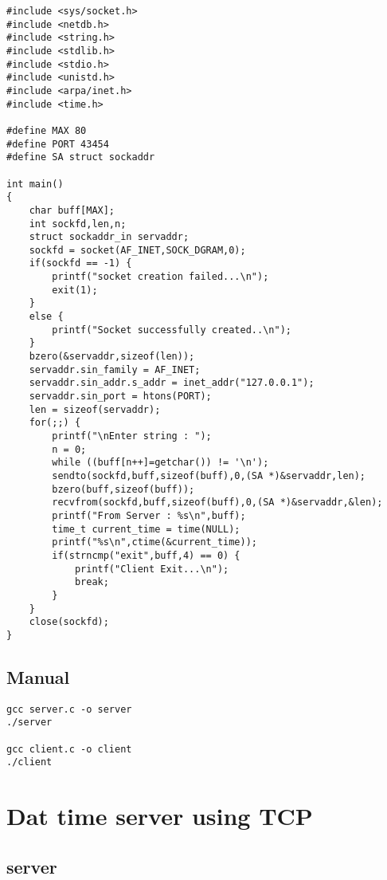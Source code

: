 \documentclass[12pt]{article}
\begin{document}
\begin{lstlisting}
#include <sys/socket.h>
#include <netdb.h>
#include <string.h>
#include <stdlib.h>
#include <stdio.h>
#include <unistd.h>
#include <arpa/inet.h>
#include <time.h>

#define MAX 80
#define PORT 43454
#define SA struct sockaddr

int main()
{
	char buff[MAX];
	int sockfd,len,n;
	struct sockaddr_in servaddr;
	sockfd = socket(AF_INET,SOCK_DGRAM,0);
	if(sockfd == -1) {
		printf("socket creation failed...\n");
		exit(1);
	}
	else {
		printf("Socket successfully created..\n");
	}
	bzero(&servaddr,sizeof(len));
	servaddr.sin_family = AF_INET;
	servaddr.sin_addr.s_addr = inet_addr("127.0.0.1");
	servaddr.sin_port = htons(PORT);
	len = sizeof(servaddr);
	for(;;) {
		printf("\nEnter string : ");
		n = 0;
		while ((buff[n++]=getchar()) != '\n');
		sendto(sockfd,buff,sizeof(buff),0,(SA *)&servaddr,len);
		bzero(buff,sizeof(buff));
		recvfrom(sockfd,buff,sizeof(buff),0,(SA *)&servaddr,&len);
		printf("From Server : %s\n",buff);
		time_t current_time = time(NULL);
		printf("%s\n",ctime(&current_time));
		if(strncmp("exit",buff,4) == 0) {
			printf("Client Exit...\n");
			break;
		}
	}
	close(sockfd);
}
\end{lstlisting}

\subsection{Manual}

\begin{lstlisting}
gcc server.c -o server
./server

gcc client.c -o client
./client
\end{lstlisting}




\section{Dat time server using TCP}
\subsection{server}
\end{document}
